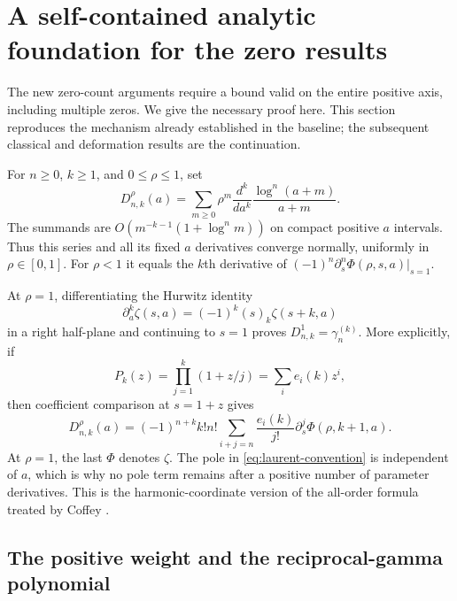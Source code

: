 \section{A self-contained analytic foundation for the zero results}
\label{sec:zero-preliminaries}

The new zero-count arguments require a bound valid on the entire positive
axis, including multiple zeros. We give the necessary proof here. This
section reproduces the mechanism already established in the baseline;
the subsequent classical and deformation results are the continuation.

For $n\ge0$, $k\ge1$, and $0\le\rho\le1$, set
\begin{equation}\label{eq:unified-D}
 D_{n,k}^{\rho}(a)=\sum_{m\ge0}\rho^m
       \frac{d^k}{da^k}\frac{\log^n(a+m)}{a+m}.
\end{equation}
The summands are $O(m^{-k-1}(1+\log^n m))$ on compact positive
$a$ intervals. Thus this series and all its fixed $a$ derivatives converge
normally, uniformly in $\rho\in[0,1]$. For $\rho<1$ it equals the
$k$th derivative of
$(-1)^n\partial_s^n\Phi(\rho,s,a)|_{s=1}$.

At $\rho=1$, differentiating the Hurwitz identity
\[
 \partial_a^k\zeta(s,a)=(-1)^k(s)_k\zeta(s+k,a)
\]
in a right half-plane and continuing to $s=1$ proves
$D_{n,k}^1=\gamma_n^{(k)}$. More explicitly, if
\[
 P_k(z)=\prod_{j=1}^k(1+z/j)=\sum_i e_i(k)z^i,
\]
then coefficient comparison at $s=1+z$ gives
\begin{equation}\label{eq:master-coefficients}
 D_{n,k}^{\rho}(a)=(-1)^{n+k}k!n!
 \sum_{i+j=n}\frac{e_i(k)}{j!}
     \partial_s^j\Phi(\rho,k+1,a).
\end{equation}
At $\rho=1$, the last $\Phi$ denotes $\zeta$. The pole in
\eqref{eq:laurent-convention} is independent of $a$, which is why no pole
term remains after a positive number of parameter derivatives. This is
the harmonic-coordinate version of the all-order formula treated by
Coffey \cite{Coffey}.

\subsection{The positive weight and the reciprocal-gamma polynomial}

